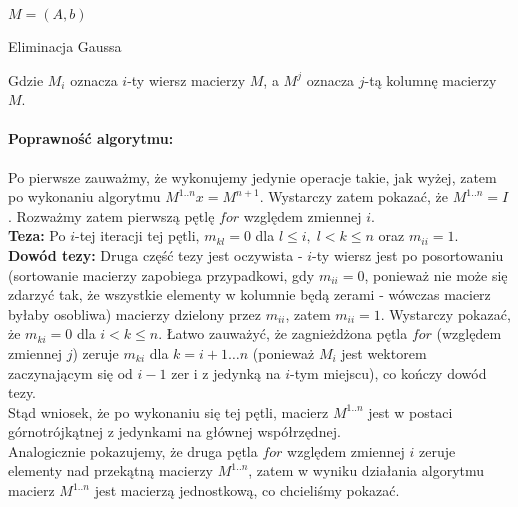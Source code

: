 \documentclass{article}
\begin{document}
\begin{algorithm}[H]
$M = (A, b)$ \;
\caption{Eliminacja Gaussa}
\end{algorithm}

Gdzie $M_i$ oznacza $i$-ty wiersz macierzy $M$, a $M^j$ oznacza $j$-tą kolumnę macierzy $M$.

\paragraph{Poprawność algorytmu:} Po pierwsze zauważmy, że wykonujemy jedynie operacje takie, jak wyżej, zatem po wykonaniu algorytmu $M^{1..n} x = M^{n+1}$. Wystarczy zatem pokazać, że $M^{1..n} = I$.
Rozważmy zatem pierwszą pętlę $for$ względem zmiennej $i$. \\

\textbf{Teza:} Po $i$-tej iteracji tej pętli, $m_{kl}= 0$ dla $l \le i, \; l < k \le n$ oraz $m_{ii} = 1$. \\

\textbf{Dowód tezy:} Druga część tezy jest oczywista - $i$-ty wiersz jest po posortowaniu (sortowanie macierzy zapobiega przypadkowi, gdy $m_{ii} = 0$, ponieważ nie może się zdarzyć tak, że wszystkie elementy w kolumnie będą zerami - wówczas macierz byłaby osobliwa) macierzy dzielony przez $m_{ii}$, zatem $m_{ii} = 1$. Wystarczy pokazać, że $m_{ki} = 0$ dla $i < k \le n$. Łatwo zauważyć, że zagnieżdżona pętla $for$ (względem zmiennej $j$) zeruje $m_{ki}$ dla $k=i+1 \dots n$ (ponieważ $M_i$ jest wektorem zaczynającym się od $i-1$ zer i z jedynką na $i$-tym miejscu), co kończy dowód tezy. \\

Stąd wniosek, że po wykonaniu się tej pętli, macierz $M^{1..n}$ jest w postaci górnotrójkątnej z jedynkami na głównej współrzędnej. \\

Analogicznie pokazujemy, że druga pętla $for$ względem zmiennej $i$ zeruje elementy nad przekątną macierzy $M^{1..n}$, zatem w wyniku działania algorytmu macierz $M^{1..n}$ jest macierzą jednostkową, co chcieliśmy pokazać.
\end{document}
